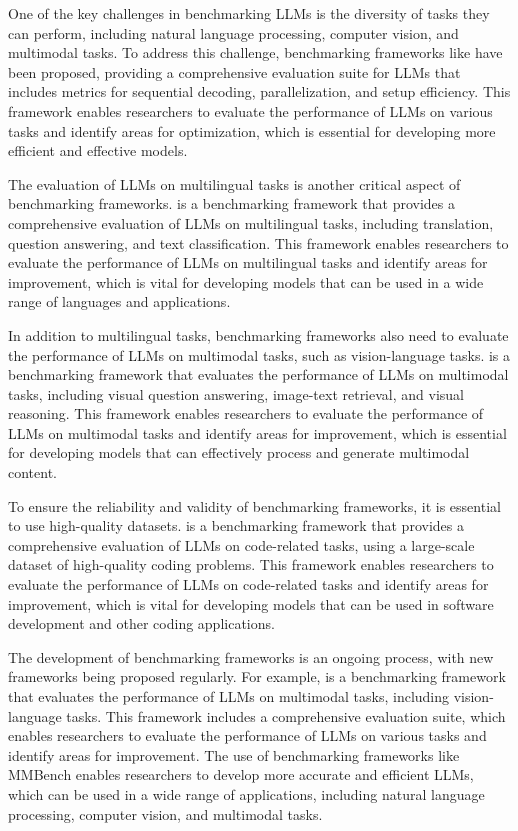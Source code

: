 \documentclass[11pt]{article}
\begin{document}
One of the key challenges in benchmarking LLMs is the diversity of tasks they can perform, including natural language processing, computer vision, and multimodal tasks. To address this challenge, benchmarking frameworks like \cite{ref198} have been proposed, providing a comprehensive evaluation suite for LLMs that includes metrics for sequential decoding, parallelization, and setup efficiency. This framework enables researchers to evaluate the performance of LLMs on various tasks and identify areas for optimization, which is essential for developing more efficient and effective models.

The evaluation of LLMs on multilingual tasks is another critical aspect of benchmarking frameworks. \cite{ref199} is a benchmarking framework that provides a comprehensive evaluation of LLMs on multilingual tasks, including translation, question answering, and text classification. This framework enables researchers to evaluate the performance of LLMs on multilingual tasks and identify areas for improvement, which is vital for developing models that can be used in a wide range of languages and applications.

In addition to multilingual tasks, benchmarking frameworks also need to evaluate the performance of LLMs on multimodal tasks, such as vision-language tasks. \cite{ref200} is a benchmarking framework that evaluates the performance of LLMs on multimodal tasks, including visual question answering, image-text retrieval, and visual reasoning. This framework enables researchers to evaluate the performance of LLMs on multimodal tasks and identify areas for improvement, which is essential for developing models that can effectively process and generate multimodal content.

To ensure the reliability and validity of benchmarking frameworks, it is essential to use high-quality datasets. \cite{ref201} is a benchmarking framework that provides a comprehensive evaluation of LLMs on code-related tasks, using a large-scale dataset of high-quality coding problems. This framework enables researchers to evaluate the performance of LLMs on code-related tasks and identify areas for improvement, which is vital for developing models that can be used in software development and other coding applications.

The development of benchmarking frameworks is an ongoing process, with new frameworks being proposed regularly. For example, \cite{ref202} is a benchmarking framework that evaluates the performance of LLMs on multimodal tasks, including vision-language tasks. This framework includes a comprehensive evaluation suite, which enables researchers to evaluate the performance of LLMs on various tasks and identify areas for improvement. The use of benchmarking frameworks like MMBench enables researchers to develop more accurate and efficient LLMs, which can be used in a wide range of applications, including natural language processing, computer vision, and multimodal tasks.
\end{document}
